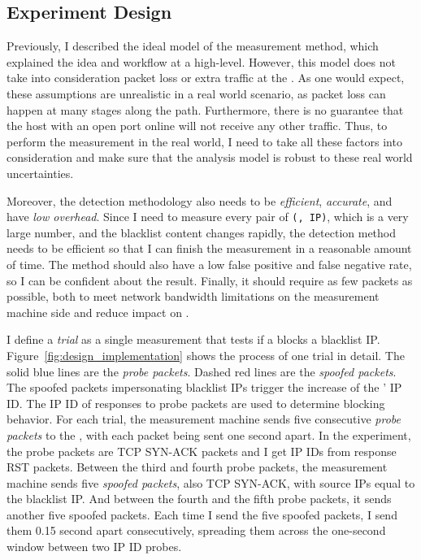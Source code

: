 
\subsection{Experiment Design}
\label{sec:methtrain}

Previously, I described the ideal model of the measurement method,
which explained the idea and workflow at a high-level. However, this model
does not take into consideration packet loss or extra traffic at the
{}. As one would expect, these assumptions are unrealistic in a real
world scenario, as packet loss can happen at many stages along the path.
Furthermore, there is no guarantee that the host with an open port online
will not receive any other traffic. Thus, to perform the measurement in the real
world, I need to take all these factors into consideration and make sure
that the analysis model is robust to these real world uncertainties.

Moreover, the detection methodology also needs to be \textit{efficient},
\textit{accurate}, and have \textit{low overhead}. Since I need to
measure every pair of \texttt{({}, IP)}, which is a
very large number, and the blacklist content changes rapidly, the detection
method needs to be efficient so that I can finish the measurement in a
reasonable amount of time. The method should also have a low false positive
and false negative rate, so I can be confident about the result. Finally, it
should require as few packets as possible, both to meet network bandwidth
limitations on the measurement machine side and reduce impact on
{}.

I define a \textit{trial} as a single measurement that tests if a
{} blocks a blacklist IP. Figure~\ref{fig:design_implementation}
shows the process of one trial in detail. 
The solid blue lines are the \textit{probe
packets}. Dashed red lines are the \textit{spoofed packets}. The spoofed
packets impersonating blacklist IPs trigger the increase of the
{}' IP ID. The IP ID of responses to probe packets are used to
determine blocking behavior.
For each trial, the measurement
machine sends five consecutive \textit{probe packets} to the {},
with each packet being sent one second apart. In the experiment, the probe
packets are TCP SYN-ACK packets and I get IP IDs from response RST packets.
Between the third and fourth probe packets, the measurement machine sends
five \textit{spoofed packets}, also TCP SYN-ACK, with source IPs equal to the
blacklist IP. And between the fourth and the fifth probe packets, it sends
another five spoofed packets. Each time I send the five spoofed packets, I
send them 0.15 second apart consecutively, spreading them across the one-second
window between two IP ID probes.

